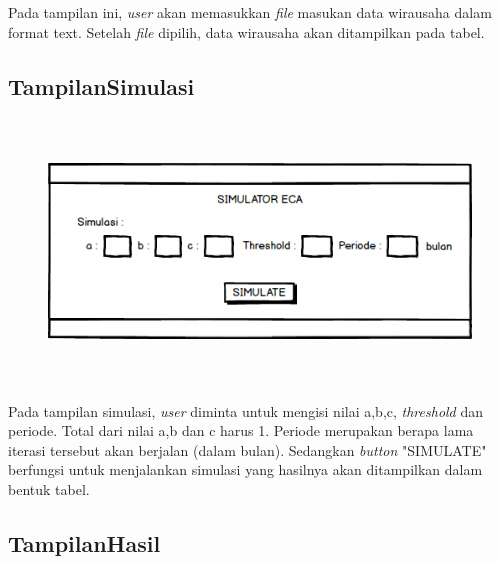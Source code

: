 Pada tampilan ini, \textit{user} akan memasukkan \textit{file} masukan data wirausaha dalam format text. Setelah \textit{file} dipilih, data wirausaha akan ditampilkan pada tabel.
\subsection{TampilanSimulasi}

\begin{figure} [H]
	\centering  
	\includegraphics[width=12cm, height=7cm]{mockup5} 
	\label{fig:simulasi} 
\end{figure}

Pada tampilan simulasi, \textit{user} diminta untuk mengisi nilai a,b,c, \textit{threshold} dan periode. Total dari nilai a,b dan c harus 1. Periode merupakan berapa lama iterasi tersebut akan berjalan (dalam bulan). Sedangkan \textit{button} "SIMULATE" berfungsi untuk menjalankan simulasi yang hasilnya akan ditampilkan dalam bentuk tabel.

\subsection{TampilanHasil}

